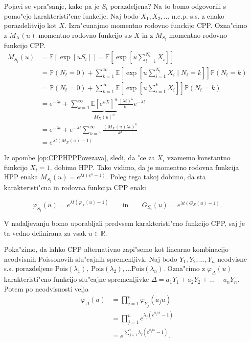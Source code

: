 \documentclass[12pt,a4paper]{amsart}
\theoremstyle{definition} %
\theoremstyle{plain} %
\newcommand{\R}{\mathbb{R}}
\newcommand{\E}{\mathbb{E}}
\newcommand{\Prob}{\mathbb{P}}
\newcommand{\1}{\mathds{1}}
\newcommand{\Pois}[1]{\text{Pois}(#1)}
\begin{document}
    \noindent
    Pojavi se vpra"sanje, kako pa je $S_t$ porazdeljena? Na to bomo odgovorili s pomo"cjo karakteristi"cne
    funkcije. Naj bodo $X_1, X_2, \dots$ n.e.p. s.s.  z enako porazdelitvijo kot $X$.
    Izra"cunajmo momentno rodovno funckijo CPP. Ozna"cimo z $M_X(u)$ momentno rodovno funkcijo 
    s.s $X$ in z $M_{S_t}$ momentno rodovno funkcijo CPP.
    \begin{align*}
        M_{S_t}(u) 
                &= \E\left[\exp\left[uS_t\right]\right] =
                    \E\left[\exp\left[u\sum_{i = 1}^{N_t}X_i\right]\right]\\
                &= \Prob\left(N_t = 0\right) + \sum_{k=1}^{\infty}
                    \E\left[\exp\left[u\sum_{i = 1}^{N_t}X_i\mid N_t=k\right]\right]\Prob\left(N_t = k\right)\\ 
                &= \Prob\left(N_t = 0\right) + \sum_{k=1}^{\infty}
                    \E\left[\exp\left[u\sum_{i = 1}^kX_i\right]\right]\Prob\left(N_t = k\right)\\
                &= e^{-\lambda t} + \sum_{k=1}^{\infty}
                    \underbrace{\E\left[e^{uX}\right]^n}_{M_X(u)^n}\frac{(\lambda t)^k}{k!}e^{-\lambda t}\\ 
                &= e^{-\lambda t} + e^{-\lambda t}\sum_{k=1}^\infty\frac{\left(M_X(u)\lambda t\right)^k}{k!}\\
                &= e^{\lambda t\left(M_X(u) - 1\right)}    
    \end{align*}

    Iz opombe \ref{op:CPPHPPPovezava}, sledi, da "ce za $X_i$ vzamemo konstantno funkcijo 
    $X_i = 1$, dobimo HPP. Tako vidimo, da je momentno rodovna funkcija HPP enaka 
    $M_{S_t}(u) = e^{\lambda t\left(e^u - 1\right)}$. Poleg tega takoj dobimo, da sta 
    karakteristi"cna in rodovna funkcija CPP enaki

    \begin{equation*}
        \varphi_{S_t}(u) = e^{\lambda t\left(\varphi_X(u) - 1\right)} \qquad \text{in} \qquad 
        G_{S_t}(u) = e^{\lambda t\left(G_X(u) - 1\right)}.
    \end{equation*} 

    \noindent
    V nadaljevanju bomo uporabljali predvsem karakteristi"cno funkcijo CPP, saj je ta vedno definirana 
    za vsak $u\in\R$.

    Poka"zimo, da lahko CPP alternativno zapi"semo kot linearno kombinacijo neodvisnih Poissonovih
    slu"cajnih spremenljivk. Naj bodo $Y_1, Y_2, \dots, Y_n$ neodvisne s.s. porazdeljene 
    $\Pois{\lambda_1}, \ \Pois{\lambda_2}, \dots \Pois{\lambda_n}$. Ozna"cimo z $\varphi_{\Delta}(u)$ 
    karakteristi"cno funkcijo slu"cajne spremenljivke $\Delta = a_1Y_1 + a_2Y_2 + \dots + a_nY_n$.
    Potem po neodvisnosti velja
    \begin{align*}
        \varphi_{\Delta}(u) 
                &= \prod_{j=1}^{n}\varphi_{Y_j}(a_ju)\\
                &= \prod_{j=1}^{n}e^{\lambda_j\left(e^{a_j i u} - 1\right)} \\
                &= e^{\sum_{j=1}^{n}\lambda_j\left(e^{a_j i u} - 1\right)}.
    \end{align*}
\end{document}
